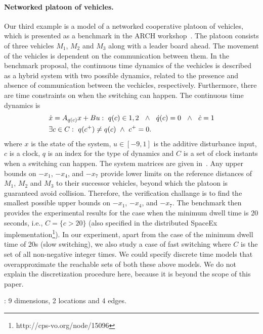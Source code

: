 \paragraph{Networked platoon of vehicles.}
Our third example is a model of a networked cooperative platoon of
vehicles, which is presented as a benchmark in the ARCH
workshop~\cite{makhlouf2014networked}.  The platoon consists of three
vehicles $M_1$, $M_2$ and $M_3$ along with a leader board ahead.  The
movement of the vehicles is dependent on the communication between
them.  In the benchmark proposal, the continuous time dynamics of the
vechicles is described as a hybrid system with two possible dynamics,
related to the presence and absence of communication between the
vechicles, respectively.  Furthermore, there are time constraints on
when the switching can happen.  The continuous time dynamics is
\vspace{-0.75em}
 \begin{align*} &\dot{x} = A_{q(c)}x+B
u:~q(c)\in{1,2}~~\wedge~~\dot{q}(c)=0~~\wedge~~\dot{c}=1\\ &\exists
c\in C:~q(c^+)\neq q(c)~\wedge~c^+=0.
\vspace{-2em}
\end{align*}
where $x$ is the state of the system, $u\in[-9,1]$ is the additive
disturbance input, $c$ is a clock, $q$ is an index
for the type of dynamics and $C$ is a set of clock instants when a
switching can happen.  The system matrices are given in~\cite{makhlouf2014networked}.
%
 Any upper bounds on $-x_1$, $-x_4$, and $-x_7$ provide lower limits
 on the reference distances of $M_1$, $M_2$ and $M_3$ to their
 successor vehicles, beyond which the platoon is guaranteed avoid
 collision.  Therefore, the verification challange is to find the
 smallest possible upper bounds on $-x_1$, $-x_4$, and $-x_7$.  The
 benchmark then provides the experimental results for the case when
 the minimum dwell time is 20 seconds, i.e., $C=\{c>20\}$ (also
 specified in the distributed SpaceEx
 implementation\footnote{http://cps-vo.org/node/15096}).  In our
 experiment, apart from the case of the minimum dwell time of 20s
 (slow switching), we also study a case of fast switching where $C$ is
 the set of all non-negative integer times.  We could specify discrete time
 models that overapproximate the reachable sets of both these above
 models.  We do not explain the discretization procedure here, because
 it is beyond the scope of this paper.

: 9 dimensions, 2
locations and 4 edges.

